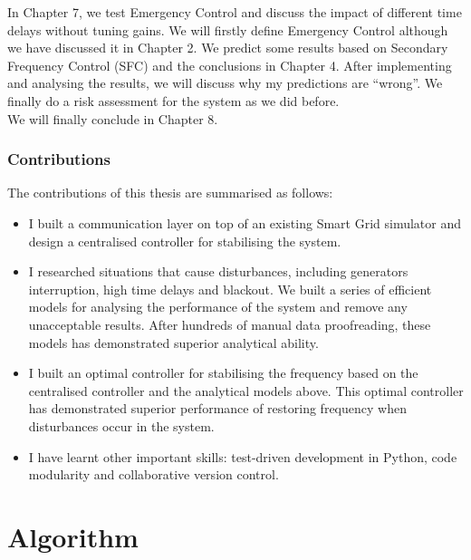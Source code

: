 \documentclass{report}
\begin{document}
In Chapter 7, we test Emergency Control and discuss the impact of different time delays without tuning gains. We will firstly define Emergency Control although we have discussed it in Chapter 2. We predict some results based on Secondary Frequency Control (SFC) and the conclusions in Chapter 4. After implementing and analysing the results, we will discuss why my predictions are “wrong”. We finally do a risk assessment for the system as we did before.\\

We will finally conclude in Chapter 8.\\

\section{Contributions} %
The contributions of this thesis are summarised as follows:\\
\begin{itemize}
  \item I built a communication layer on top of an existing Smart Grid simulator and design a centralised controller for stabilising the system.\\
  
  \item I researched situations that cause disturbances, including generators interruption, high time delays and blackout. We built a series of efficient models for analysing the performance of the system and remove any unacceptable results. After hundreds of manual data proofreading, these models has demonstrated superior analytical ability.\\
  
  \item I built an optimal controller for stabilising the frequency based on the centralised controller and the analytical models above. This optimal controller has demonstrated superior performance of restoring frequency when disturbances occur in the system.\\
  
  \item I have learnt other important skills: test-driven development in Python, code modularity and collaborative version control.\\
\end{itemize}


\part{Algorithm}
\end{document}
